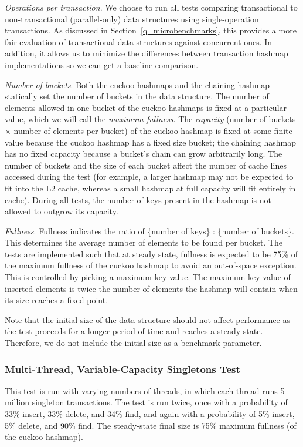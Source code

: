 \emph{Operations per transaction}. We choose to run all tests comparing transactional to non-transactional (parallel-only) data structures using single-operation transactions. As discussed in Section~\ref{q_microbenchmarks}, this provides a more fair evaluation of transactional data structures against concurrent ones. In addition, it allows us to minimize the differences between transaction hashmap implementations so we can get a baseline comparison.

\emph{Number of buckets}. Both the cuckoo hashmaps and the chaining hashmap statically set the number of buckets in the data structure. The number of elements allowed in one bucket of the cuckoo hashmaps is fixed at a particular value, which we will call the \emph{maximum fullness}. 
        The \emph{capacity} (number of buckets $\times$ number of elements per bucket) of the cuckoo hashmap is fixed at some finite value because the cuckoo hashmap has a fixed size bucket; the chaining hashmap has no fixed capacity because a bucket's chain can grow arbitrarily long.
        The number of buckets and the size of each bucket affect the number of cache lines accessed during the test (for example, a larger hashmap may not be expected to fit into the L2 cache, whereas a small hashmap at full capacity will fit entirely in cache). During all tests, the number of keys present in the hashmap is not allowed to outgrow its capacity.
    
    \emph{Fullness}. Fullness indicates the ratio of \{number of keys\} : \{number of buckets\}. This determines the average number of elements to be found per bucket. The tests are implemented such that at steady state, fullness is expected to be 75\% of the maximum fullness of the cuckoo hashmap to avoid an out-of-space exception. This is controlled by picking a maximum key value. The maximum key value of inserted elements is twice the number of elements the hashmap will contain when its size reaches a fixed point.

        Note that the initial size of the data structure should not affect performance as the test proceeds for a longer period of time and reaches a steady state. Therefore, we do not include the initial size as a benchmark parameter.

\subsubsection{Multi-Thread, Variable-Capacity Singletons Test} 
This test is run with varying numbers of threads, in which each thread runs 5 million singleton transactions.
The test is run twice, once with a probability of 33\% insert, 33\% delete, and 34\% find, and again with a probability of 5\% insert, 5\% delete, and 90\% find. The steady-state final size is 75\% maximum fullness (of the cuckoo hashmap).

